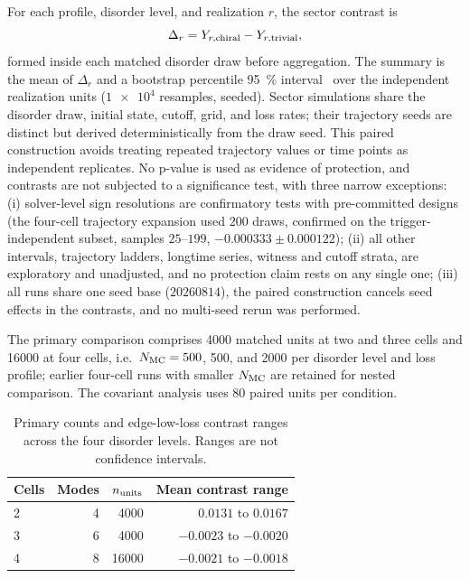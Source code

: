 \documentclass[aps,pra,preprint,superscriptaddress,amsmath,amssymb]{revtex4-2}
\begin{document}
For each profile, disorder level, and realization $r$, the sector contrast is
\begin{equation}\label{eq:contrast}
\Delta_r=Y_{r,{\rm chiral}}-Y_{r,{\rm trivial}},
\end{equation}
formed inside each matched disorder draw before aggregation. The summary is the mean of $\Delta_r$ and a bootstrap percentile \qty{95}{\percent} interval~\cite{Efron1979} over the independent realization units ($\num[retain-unity-mantissa = false]{1e4}$ resamples, seeded). Sector simulations share the disorder draw, initial state, cutoff, grid, and loss rates; their trajectory seeds are distinct but derived deterministically from the draw seed. This paired construction avoids treating repeated trajectory values or time points as independent replicates. No p-value is used as evidence of protection, and contrasts are not subjected to a significance test, with three narrow exceptions: (i) solver-level sign resolutions are confirmatory tests with pre-committed designs (the four-cell trajectory expansion used $\num{200}$ draws, confirmed on the trigger-independent subset, samples $\num{25}$--$\num{199}$, $-\num{0.000333}\pm\num{0.000122}$); (ii) all other intervals, trajectory ladders, longtime series, witness and cutoff strata, are exploratory and unadjusted, and no protection claim rests on any single one; (iii) all runs share one seed base ($\num{20260814}$), the paired construction cancels seed effects in the contrasts, and no multi-seed rerun was performed.

The primary comparison comprises \num{4000} matched units at two and three cells and \num{16000} at four cells, i.e.\ $N_{\rm MC}=\num{500}$, \num{500}, and \num{2000} per disorder level and loss profile; earlier four-cell runs with smaller $N_{\rm MC}$ are retained for nested comparison. The covariant analysis uses \num{80} paired units per condition.

\begin{table}[h]
\caption{Primary counts and edge-low-loss contrast ranges across the four disorder levels. Ranges are not confidence intervals.}
\label{tab:paired-comparison}
\begin{ruledtabular}
\begin{tabular}{lrrr}
Cells & Modes & $n_{\rm units}$ & Mean contrast range \\
\hline
\num{2} & \num{4} & \num{4000} & $\num{+0.0131}$ to $\num{+0.0167}$ \\
\num{3} & \num{6} & \num{4000} & $\num{-0.0023}$ to $\num{-0.0020}$ \\
\num{4} & \num{8} & \num{16000} & $\num{-0.0021}$ to $\num{-0.0018}$ \\
\end{tabular}
\end{ruledtabular}
\end{table}
\end{document}
